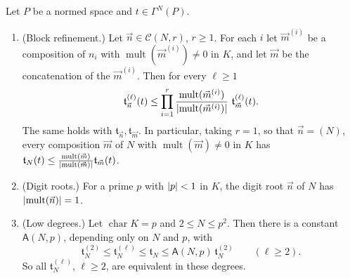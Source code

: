 \begin{proposition}\label{dp:prop:base-p}
Let $P$ be a normed space and $t\in\Gamma^N(P)$.
\begin{enumerate}
\item \textup{(Block refinement.)} Let $\vec n\in\mathcal C(N,r)$, $r\ge1$. For each $i$ let $\vec m^{(i)}$ be a composition of $n_i$ with $\operatorname{mult}(\vec m^{(i)})\ne0$ in $K$, and let $\vec m$ be the concatenation of the $\vec m^{(i)}$. Then for every $\ell\ge1$
\[
 \mathfrak t^{(\ell)}_{\vec n}(t)\le\prod_{i=1}^r\frac{\operatorname{mult}(\vec m^{(i)})}{\lvert \operatorname{mult}(\vec m^{(i)})\rvert}\ \mathfrak t^{(\ell)}_{\vec m}(t).
\]
The same holds with $\mathfrak t_{\vec n},\mathfrak t_{\vec m}$. In particular, taking $r=1$, so that $\vec n=(N)$, every composition $\vec m$ of $N$ with $\operatorname{mult}(\vec m)\ne0$ in $K$ has $\mathfrak t_N(t)\le\frac{\operatorname{mult}(\vec m)}{\lvert \operatorname{mult}(\vec m)\rvert}\mathfrak t_{\vec m}(t)$.
\item \textup{(Digit roots.)} For a prime $p$ with $\lvert p\rvert<1$ in $K$, the digit root $\vec n$ of $N$ has $\lvert \operatorname{mult}(\vec n)\rvert=1$.
\item \textup{(Low degrees.)} Let $\operatorname{char}K=p$ and $2\le N\le p^2$. Then there is a constant $\mathsf A(N,p)$, depending only on $N$ and $p$, with
\[
 \mathfrak t^{(2)}_N\le\mathfrak t^{(\ell)}_N\le\mathfrak t_N\le\mathsf A(N,p)\,\mathfrak t^{(2)}_N\qquad(\ell\ge2).
\]
So all $\mathfrak t^{(\ell)}_N$, $\ell\ge2$, are equivalent in these degrees.
\end{enumerate}
\end{proposition}

